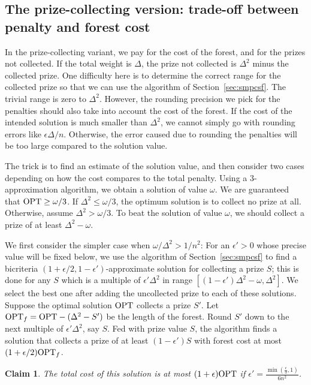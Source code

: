 \documentclass[extras,11pt]{article} \usepackage{fullpage}
\theoremstyle{mytheorem}
\newtheorem{claim}[theorem]{Claim}
\newcommand{\eps}{\epsilon}
\newcommand{\OPT}{\mbox{\rm OPT}}
\begin{document}
\subsection{The prize-collecting version: trade-off between penalty and forest cost}\label{sec:prize-mpcsf}

In the prize-collecting variant, we pay for the cost of the forest,
and for the prizes not collected.
If the total weight is $\Delta$,
the prize not collected is $\Delta^2$ minus the collected prize.
One difficulty here is to determine the correct range for the collected prize
so that we can use the algorithm of Section~\ref{sec:smpcsf}.
The trivial range is zero to $\Delta^2$.
However, the rounding precision we pick for the penalties should also take into
account the cost of the forest.  If the cost of the intended solution is much smaller than
$\Delta^2$, we cannot simply go with rounding errors like $\eps\Delta/n$.
Otherwise, the error caused due to rounding the penalties will be too large compared to the solution value.

The trick is to find an estimate of the solution value, and then consider two cases depending on
how the cost compares to the total penalty.
Using a $3$-approximation  algorithm, we obtain a solution of value $\omega$.
We are guaranteed that $\OPT \geq \omega/3$.
If $\Delta^2 \leq \omega/3$,
 the optimum solution is to collect no prize at all.
Otherwise, assume $\Delta^2 > \omega/3$.
To beat the solution of value $\omega$, we should collect
a prize of at least $\Delta^2-\omega$.


We first consider the simpler case when $\omega/\Delta^2 > 1/n^2$:
For an $\eps' >0$ whose precise value will be fixed below,
we use the algorithm of Section~\ref{sec:smpcsf} to find
a bicriteria $(1+\eps/2,1-\eps')$-approximate solution for collecting
a prize $S$; this is done for any $S$ which is a multiple of $\eps'\Delta^2$
in range $[(1-\eps')\Delta^2-\omega, \Delta^2]$.
We select the best one after adding the uncollected prize to each
of these solutions.
Suppose the optimal solution $\OPT$ collects a prize $S'$.
Let $\OPT_f = \OPT - (\Delta^2 - S')$ be the length of the forest.
Round $S'$ down to the next multiple of $\eps'\Delta^2$, say $S$.
Fed with prize value $S$, the algorithm finds a solution that collects
a prize of at least $(1-\eps')S$ with forest cost at most $(1+\eps/2)\OPT_f$.
\begin{claim}\label{clm:mpcsf:eps}
The total cost of this solution is at most $(1+\eps)\OPT$ if $\eps' = \frac{\min\left( \frac{\eps}{3}, 1  \right)}{6n^2}$.
\end{claim}
\end{document}
